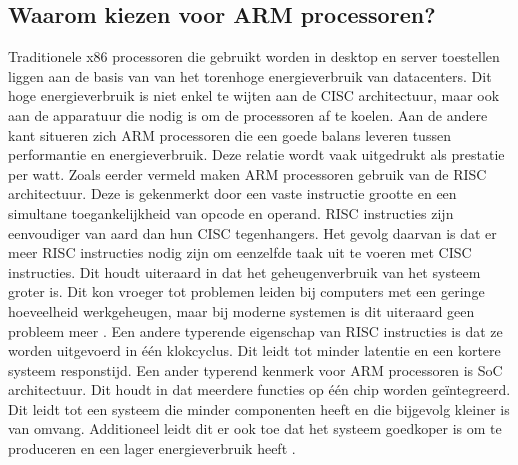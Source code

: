 \subsection{Waarom kiezen voor ARM processoren?}
Traditionele x86 processoren die gebruikt worden in desktop en server toestellen liggen aan de basis van van het torenhoge energieverbruik van datacenters. Dit hoge energieverbruik is niet enkel te wijten aan de CISC architectuur, maar ook aan de apparatuur die nodig is om de processoren af te koelen. Aan de andere kant situeren zich ARM processoren die een goede balans leveren tussen performantie en energieverbruik. Deze relatie wordt vaak uitgedrukt als prestatie per watt. Zoals eerder vermeld maken ARM processoren gebruik van de RISC architectuur. Deze is gekenmerkt door een vaste instructie grootte en een simultane toegankelijkheid van opcode en operand. RISC instructies zijn eenvoudiger van aard dan hun CISC tegenhangers. Het gevolg daarvan is dat er meer RISC instructies nodig zijn om eenzelfde taak uit te voeren met CISC instructies. Dit houdt uiteraard in dat het geheugenverbruik van het systeem groter is. Dit kon vroeger tot problemen leiden bij computers met een geringe hoeveelheid werkgeheugen, maar bij moderne systemen is dit uiteraard geen probleem meer \autocite{Aroca2012}. Een andere typerende eigenschap van RISC instructies is dat ze worden uitgevoerd in één klokcyclus. Dit leidt tot minder latentie en een kortere systeem responstijd. Een ander typerend kenmerk voor ARM processoren is SoC architectuur. Dit houdt in dat meerdere functies op één chip worden geïntegreerd. Dit leidt tot een systeem die minder componenten heeft en die bijgevolg kleiner is van omvang. Additioneel leidt dit er ook toe dat het systeem goedkoper is om te produceren en een lager energieverbruik heeft \autocite{Ravali2016}.


